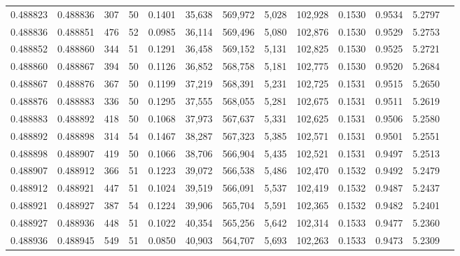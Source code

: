 \begin{tabular}{rrrrrrrrrrrrr}
0.488823 & 0.488836 & 307 &  50 &                                     0.1401 &  35,638 & 569,972 &   5,028 & 102,928 & 0.1530 & 0.9534 & 5.2797 \\
0.488836 & 0.488851 & 476 &  52 &                                     0.0985 &  36,114 & 569,496 &   5,080 & 102,876 & 0.1530 & 0.9529 & 5.2753 \\
0.488852 & 0.488860 & 344 &  51 &                                     0.1291 &  36,458 & 569,152 &   5,131 & 102,825 & 0.1530 & 0.9525 & 5.2721 \\
0.488860 & 0.488867 & 394 &  50 &                                     0.1126 &  36,852 & 568,758 &   5,181 & 102,775 & 0.1530 & 0.9520 & 5.2684 \\
0.488867 & 0.488876 & 367 &  50 &                                     0.1199 &  37,219 & 568,391 &   5,231 & 102,725 & 0.1531 & 0.9515 & 5.2650 \\
0.488876 & 0.488883 & 336 &  50 &                                     0.1295 &  37,555 & 568,055 &   5,281 & 102,675 & 0.1531 & 0.9511 & 5.2619 \\
0.488883 & 0.488892 & 418 &  50 &                                     0.1068 &  37,973 & 567,637 &   5,331 & 102,625 & 0.1531 & 0.9506 & 5.2580 \\
0.488892 & 0.488898 & 314 &  54 &                                     0.1467 &  38,287 & 567,323 &   5,385 & 102,571 & 0.1531 & 0.9501 & 5.2551 \\
0.488898 & 0.488907 & 419 &  50 &                                     0.1066 &  38,706 & 566,904 &   5,435 & 102,521 & 0.1531 & 0.9497 & 5.2513 \\
0.488907 & 0.488912 & 366 &  51 &                                     0.1223 &  39,072 & 566,538 &   5,486 & 102,470 & 0.1532 & 0.9492 & 5.2479 \\
0.488912 & 0.488921 & 447 &  51 &                                     0.1024 &  39,519 & 566,091 &   5,537 & 102,419 & 0.1532 & 0.9487 & 5.2437 \\
0.488921 & 0.488927 & 387 &  54 &                                     0.1224 &  39,906 & 565,704 &   5,591 & 102,365 & 0.1532 & 0.9482 & 5.2401 \\
0.488927 & 0.488936 & 448 &  51 &                                     0.1022 &  40,354 & 565,256 &   5,642 & 102,314 & 0.1533 & 0.9477 & 5.2360 \\
0.488936 & 0.488945 & 549 &  51 &                                     0.0850 &  40,903 & 564,707 &   5,693 & 102,263 & 0.1533 & 0.9473 & 5.2309 \\

\end{tabular}
